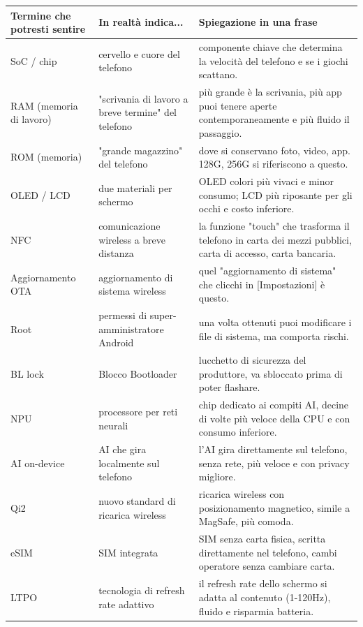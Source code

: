 
\begin{center}
\begin{tabularx}{\linewidth}{|X|X|X|}
\hline
\textbf{Termine che potresti sentire} & \textbf{In realtà indica...} & \textbf{Spiegazione in una frase} \tabularnewline
\hline
SoC / chip & cervello e cuore del telefono & componente chiave che determina la velocità del telefono e se i giochi scattano. \tabularnewline
RAM (memoria di lavoro) & "scrivania di lavoro a breve termine" del telefono & più grande è la scrivania, più app puoi tenere aperte contemporaneamente e più fluido il passaggio. \tabularnewline
ROM (memoria) & "grande magazzino" del telefono & dove si conservano foto, video, app. 128G, 256G si riferiscono a questo. \tabularnewline
OLED / LCD & due materiali per schermo & OLED colori più vivaci e minor consumo; LCD più riposante per gli occhi e costo inferiore. \tabularnewline
NFC & comunicazione wireless a breve distanza & la funzione "touch" che trasforma il telefono in carta dei mezzi pubblici, carta di accesso, carta bancaria. \tabularnewline
Aggiornamento OTA & aggiornamento di sistema wireless & quel "aggiornamento di sistema" che clicchi in [Impostazioni] è questo. \tabularnewline
Root & permessi di super-amministratore Android & una volta ottenuti puoi modificare i file di sistema, ma comporta rischi. \tabularnewline
BL lock & Blocco Bootloader & lucchetto di sicurezza del produttore, va sbloccato prima di poter flashare. \tabularnewline
NPU & processore per reti neurali & chip dedicato ai compiti AI, decine di volte più veloce della CPU e con consumo inferiore. \tabularnewline
AI on-device & AI che gira localmente sul telefono & l'AI gira direttamente sul telefono, senza rete, più veloce e con privacy migliore. \tabularnewline
Qi2 & nuovo standard di ricarica wireless & ricarica wireless con posizionamento magnetico, simile a MagSafe, più comoda. \tabularnewline
eSIM & SIM integrata & SIM senza carta fisica, scritta direttamente nel telefono, cambi operatore senza cambiare carta. \tabularnewline
LTPO & tecnologia di refresh rate adattivo & il refresh rate dello schermo si adatta al contenuto (1-120Hz), fluido e risparmia batteria. \tabularnewline
\hline
\end{tabularx}
\end{center}
